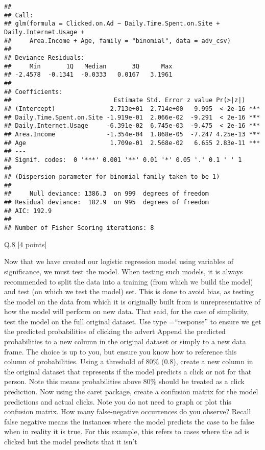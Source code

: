 \documentclass[
]{article}
\begin{document}
\begin{verbatim}
## 
## Call:
## glm(formula = Clicked.on.Ad ~ Daily.Time.Spent.on.Site + Daily.Internet.Usage + 
##     Area.Income + Age, family = "binomial", data = adv_csv)
## 
## Deviance Residuals: 
##     Min       1Q   Median       3Q      Max  
## -2.4578  -0.1341  -0.0333   0.0167   3.1961  
## 
## Coefficients:
##                            Estimate Std. Error z value Pr(>|z|)    
## (Intercept)               2.713e+01  2.714e+00   9.995  < 2e-16 ***
## Daily.Time.Spent.on.Site -1.919e-01  2.066e-02  -9.291  < 2e-16 ***
## Daily.Internet.Usage     -6.391e-02  6.745e-03  -9.475  < 2e-16 ***
## Area.Income              -1.354e-04  1.868e-05  -7.247 4.25e-13 ***
## Age                       1.709e-01  2.568e-02   6.655 2.83e-11 ***
## ---
## Signif. codes:  0 '***' 0.001 '**' 0.01 '*' 0.05 '.' 0.1 ' ' 1
## 
## (Dispersion parameter for binomial family taken to be 1)
## 
##     Null deviance: 1386.3  on 999  degrees of freedom
## Residual deviance:  182.9  on 995  degrees of freedom
## AIC: 192.9
## 
## Number of Fisher Scoring iterations: 8
\end{verbatim}

Q.8 {[}4 points{]}

Now that we have created our logistic regression model using variables
of significance, we must test the model. When testing such models, it is
always recommended to split the data into a training (from which we
build the model) and test (on which we test the model) set. This is done
to avoid bias, as testing the model on the data from which it is
originally built from is unrepresentative of how the model will perform
on new data. That said, for the case of simplicity, test the model on
the full original dataset. Use type =``response'' to ensure we get the
predicted probabilities of clicking the advert Append the predicted
probabilities to a new column in the original dataset or simply to a new
data frame. The choice is up to you, but ensure you know how to
reference this column of probabilities. Using a threshold of 80\% (0.8),
create a new column in the original dataset that represents if the model
predicts a click or not for that person. Note this means probabilities
above 80\% should be treated as a click prediction. Now using the caret
package, create a confusion matrix for the model predictions and actual
clicks. Note you do not need to graph or plot this confusion matrix. How
many false-negative occurrences do you observe? Recall false negative
means the instances where the model predicts the case to be false when
in reality it is true. For this example, this refers to cases where the
ad is clicked but the model predicts that it isn't
\end{document}
